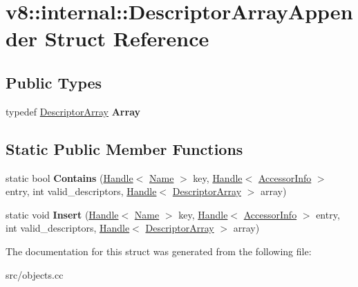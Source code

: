 \hypertarget{structv8_1_1internal_1_1_descriptor_array_appender}{}\section{v8\+:\+:internal\+:\+:Descriptor\+Array\+Appender Struct Reference}
\label{structv8_1_1internal_1_1_descriptor_array_appender}
\subsection*{Public Types}
\begin{DoxyCompactItemize}
\item 
\hypertarget{structv8_1_1internal_1_1_descriptor_array_appender_a4732e727119c2c3045101f2bd9f44ecb}{}typedef \hyperlink{classv8_1_1internal_1_1_descriptor_array}{Descriptor\+Array} {\bfseries Array}\label{structv8_1_1internal_1_1_descriptor_array_appender_a4732e727119c2c3045101f2bd9f44ecb}

\end{DoxyCompactItemize}
\subsection*{Static Public Member Functions}
\begin{DoxyCompactItemize}
\item 
\hypertarget{structv8_1_1internal_1_1_descriptor_array_appender_a36eb28bee1c75ac294d609a2f3aa410b}{}static bool {\bfseries Contains} (\hyperlink{classv8_1_1internal_1_1_handle}{Handle}$<$ \hyperlink{classv8_1_1internal_1_1_name}{Name} $>$ key, \hyperlink{classv8_1_1internal_1_1_handle}{Handle}$<$ \hyperlink{classv8_1_1internal_1_1_accessor_info}{Accessor\+Info} $>$ entry, int valid\+\_\+descriptors, \hyperlink{classv8_1_1internal_1_1_handle}{Handle}$<$ \hyperlink{classv8_1_1internal_1_1_descriptor_array}{Descriptor\+Array} $>$ array)\label{structv8_1_1internal_1_1_descriptor_array_appender_a36eb28bee1c75ac294d609a2f3aa410b}

\item 
\hypertarget{structv8_1_1internal_1_1_descriptor_array_appender_a007017803de89d0b1f2a2cbf9f69f97f}{}static void {\bfseries Insert} (\hyperlink{classv8_1_1internal_1_1_handle}{Handle}$<$ \hyperlink{classv8_1_1internal_1_1_name}{Name} $>$ key, \hyperlink{classv8_1_1internal_1_1_handle}{Handle}$<$ \hyperlink{classv8_1_1internal_1_1_accessor_info}{Accessor\+Info} $>$ entry, int valid\+\_\+descriptors, \hyperlink{classv8_1_1internal_1_1_handle}{Handle}$<$ \hyperlink{classv8_1_1internal_1_1_descriptor_array}{Descriptor\+Array} $>$ array)\label{structv8_1_1internal_1_1_descriptor_array_appender_a007017803de89d0b1f2a2cbf9f69f97f}

\end{DoxyCompactItemize}


The documentation for this struct was generated from the following file\+:\begin{DoxyCompactItemize}
\item 
src/objects.\+cc\end{DoxyCompactItemize}
